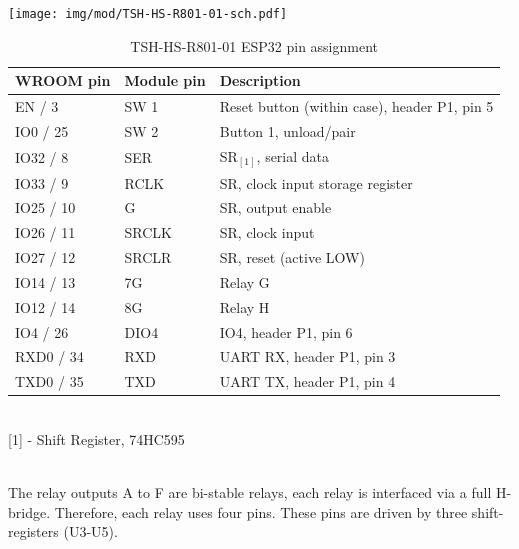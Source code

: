 \documentclass[]{scrreprt}%
\begin{document}
\texttt{[image: img/mod/TSH-HS-R801-01-sch.pdf]}

\begin{table}[h!]
\centering
\label{TSH-HS-R801-01-pins}
\begin{tabular}{|l|l|l|}
\hline
WROOM pin	& Module pin 	& Description \\ \hline \hline
EN / 3		& SW 1		& Reset button (within case), header P1, pin 5 \\ \hline
IO0 / 25	& SW 2		& Button 1, unload/pair \\ \hline
IO32 / 8	& SER		& SR$_{[1]}$, serial data \\ \hline
IO33 / 9 	& RCLK		& SR, clock input storage register \\ \hline
IO25 / 10	& G		& SR, output enable \\ \hline
IO26 / 11	& SRCLK		& SR, clock input \\ \hline
IO27 / 12	& SRCLR		& SR, reset (active LOW) \\ \hline 
IO14 / 13	& 7G		& Relay G \\ \hline 
IO12 / 14 	& 8G		& Relay H \\ \hline 
IO4 / 26	& DIO4		& IO4, header P1, pin 6 \\ \hline
RXD0 / 34	& RXD		& UART RX, header P1, pin 3 \\ \hline 
TXD0 / 35	& TXD		& UART TX, header P1, pin 4 \\ \hline
\end{tabular}
\\
\footnotesize [1] - Shift Register, 74HC595
\caption{TSH-HS-R801-01 ESP32 pin assignment}
\end{table}
 
\hfill \\

The relay outputs A to F are bi-stable relays, each relay is interfaced via a full H-bridge.
Therefore, each relay uses four pins. These pins are driven by three shift-registers (U3-U5).
\end{document}
